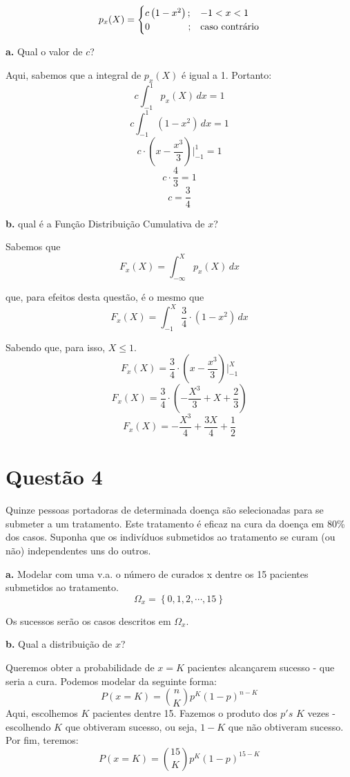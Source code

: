 \documentclass[a5paper]{report}
\begin{document}
\begin{equation*}
	p_x(X) =
	\begin{cases}
		c\left(1 - x^2 \right) ; & -1 < x < 1 \\
		0 \hspace{1.4cm}; & \text{caso contrário}
	\end{cases}       
\end{equation*}

\textbf{a.} Qual o valor de $c$?

Aqui, sabemos que a integral de $p_x(X)$ é igual a 1. Portanto:
\[c\int_{-1}^{1} p_x(X)\,dx = 1\]
\[c\int_{-1}^{1} (1 - x^2)\,dx = 1\]
\[c \cdot \left(x - \frac{x^3}{3}\right) \bigg|_{-1}^{1} = 1\]
\[c \cdot \frac{4}{3} = 1\]
\[c = \frac{3}{4}\]

\textbf{b.} qual é a Função Distribuição Cumulativa de $x$?

Sabemos que
\[F_x(X) = \int_{-\infty}^{X} p_x(X)\,dx\]

que, para efeitos desta questão, é o mesmo que
\[F_x(X) = \int_{-1}^{X} \frac{3}{4} \cdot \left(1 - x^2\right)\,dx\]

Sabendo que, para isso, $X \leq 1$.
\[F_x(X) = \frac{3}{4} \cdot \left(x - \frac{x^3}{3}\right) \bigg|_{-1}^{X}\]
\[F_x(X) = \frac{3}{4} \cdot \left(-\frac{X^3}{3} + X + \frac{2}{3}\right)\]
\[F_x(X) = -\frac{X^3}{4} + \frac{3X}{4} + \frac{1}{2}\]


\section*{Questão 4}
Quinze pessoas portadoras de determinada doença são selecionadas para se submeter
a um tratamento. Este tratamento é eficaz na cura da doença em 80\% dos casos.
Suponha que os indivíduos submetidos ao tratamento se curam (ou não) independentes
uns do outros.

\textbf{a.} Modelar com uma v.a. o número de curados x dentre os 15 pacientes submetidos ao tratamento.
\[\Omega_x = \left\{0, 1, 2, \cdots, 15\right\}\]

Os sucessos serão os casos descritos em $\Omega_x$.

\textbf{b.}
Qual a distribuição de $x$?

Queremos obter a probabilidade de $x = K$ pacientes alcançarem sucesso - que seria a cura. Podemos modelar da seguinte forma:
\[P(x = K) = \binom{n}{K} p^K (1 - p)^{n - K}\]
Aqui, escolhemos $K$ pacientes dentre 15. Fazemos o produto dos $p's$ $K$ vezes - escolhendo $K$ que obtiveram sucesso, ou seja, $1 - K$ que não obtiveram sucesso. Por fim, teremos:
\[P(x = K) = \binom{15}{K} p^K (1 - p)^{15 - K}\]
\end{document}
